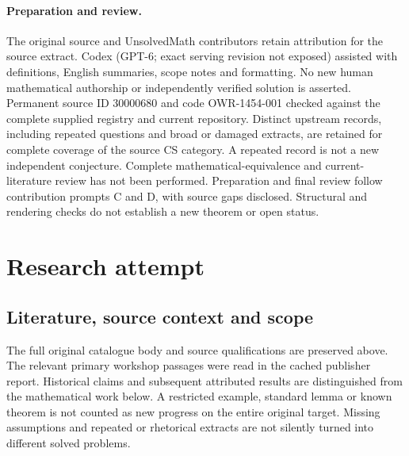 \documentclass[11pt]{article}
\begin{document}
\paragraph{Preparation and review.}
The original source and UnsolvedMath contributors retain attribution for the source extract. Codex (GPT-6; exact serving revision not exposed) assisted with definitions, English summaries, scope notes and formatting. No new human mathematical authorship or independently verified solution is asserted. Permanent source ID 30000680 and code OWR-1454-001 checked against the complete supplied registry and current repository. Distinct upstream records, including repeated questions and broad or damaged extracts, are retained for complete coverage of the source CS category. A repeated record is not a new independent conjecture. Complete mathematical-equivalence and current-literature review has not been performed. Preparation and final review follow contribution prompts C and D, with source gaps disclosed. Structural and rendering checks do not establish a new theorem or open status.
\label{end:30000680}

\section{Research attempt}
\subsection{Literature, source context and scope}
The full original catalogue body and source qualifications are preserved above. The relevant primary workshop passages were read in the cached publisher report. Historical claims and subsequent attributed results are distinguished from the mathematical work below. A restricted example, standard lemma or known theorem is not counted as new progress on the entire original target. Missing assumptions and repeated or rhetorical extracts are not silently turned into different solved problems.
\end{document}
